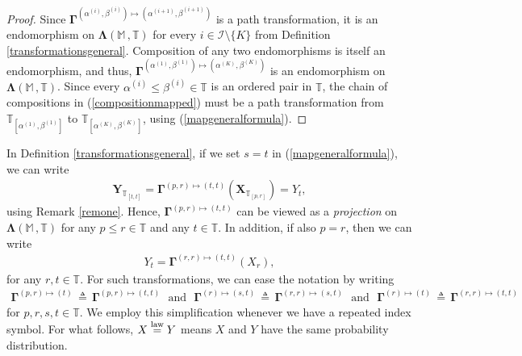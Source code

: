 \documentclass[12pt,a4paper]{article}
\def\M{\mathbb{M}}
\def\T{\mathbb{T}}
\def\law{\overset{\textnormal{law}}{=}}
\begin{document}
\begin{proof}
Since $\boldsymbol{\Gamma}^{\left(\alpha^{(i)},\beta^{(i)}\right)\mapsto\left(\alpha^{(i+1)},\beta^{(i+1)}\right)}$ is a path transformation, it is an endomorphism on $\boldsymbol{\Lambda}(\mathbb M \,, \T)$ for every $i\in\mathcal{I}\setminus\{K\}$ from Definition \ref{transformationsgeneral}. Composition of any two endomorphisms is itself an endomorphism, and thus, $\boldsymbol{\Gamma}^{\left(\alpha^{(1)},\beta^{(1)}\right)\mapsto\left(\alpha^{(K)},\beta^{(K)}\right)}$ is an endomorphism on $\boldsymbol{\Lambda}(\mathbb M \,, \T)$. Since every $\alpha^{(i)}\leq \beta^{(i)} \in \T$ is an ordered pair in $\T$, the chain of compositions in (\ref{compositionmapped}) must be a path transformation from $\T_{[\alpha^{(1)},\beta^{(1)}]}$ to $\T_{[\alpha^{(K)},\beta^{(K)}]}$, using (\ref{mapgeneralformula}).
\end{proof}
In Definition \ref{transformationsgeneral}, if we set $s=t$ in (\ref{mapgeneralformula}), we can write
\begin{align}
\boldsymbol{Y}_{\T_{[t,t]}} = \boldsymbol{\Gamma}^{(p,r)\mapsto(t,t)}\left( \boldsymbol{X}_{\T_{[p,r]}}\right) = Y_t, \label{projectionformula}
\end{align}
using Remark \ref{remone}. Hence, $\boldsymbol{\Gamma}^{(p,r)\mapsto(t,t)}$ can be viewed as a \emph{projection} on $\boldsymbol{\Lambda}(\M \,, \T)$ for any $p\leq r \in \T$ and any $t \in \T$. In addition, if also $p=r$, then we can write
\begin{align}
Y_t = \boldsymbol{\Gamma}^{(r,r)\mapsto(t,t)}\left( X_r \right), \label{projectionformulatwo}
\end{align}
for any $r,t \in \T$. For such transformations, we can ease the notation by writing
\begin{align}
\boldsymbol{\Gamma}^{(p,r)\mapsto(t)} \,\triangleq \, \boldsymbol{\Gamma}^{(p,r)\mapsto(t,t)} \,\,\,\, \text{and} \,\,\,\, \boldsymbol{\Gamma}^{(r)\mapsto(s,t)} \,\triangleq \, \boldsymbol{\Gamma}^{(r,r)\mapsto(s,t)} \,\,\,\, \text{and} \,\,\,\, \boldsymbol{\Gamma}^{(r)\mapsto(t)} \,\triangleq \, \boldsymbol{\Gamma}^{(r,r)\mapsto(t,t)} 
\end{align} 
for $p,r,s,t \in \T$. We employ this simplification whenever we have a repeated index symbol. For what follows, $X \law Y$ means $X$ and $Y$ have the same probability distribution. 
%
\end{document}
